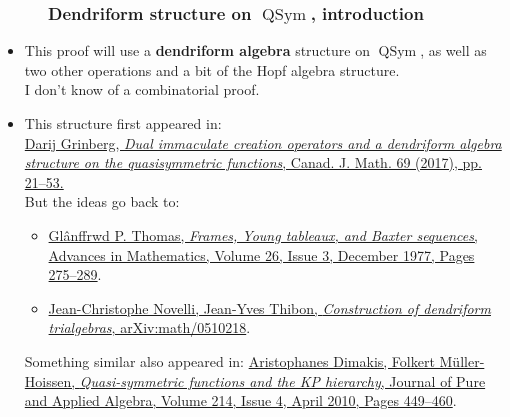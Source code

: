 \documentclass{beamer}
\newcommand{\red}{\color{red}}
\newcommand{\QSym}{\operatorname{QSym}}
\newcommand{\fti}[1]{\frametitle{\ \ \ \ \ #1}}
\theoremstyle{plain}
\begin{document}
\begin{frame}
\fti{Dendriform structure on $\QSym$, introduction}

\begin{itemize}

\item This proof will use a \textbf{dendriform algebra} structure on $\QSym$,
      as well as two other operations and a bit of the Hopf algebra
      structure. \\
      I don't know of a combinatorial proof.

\item This structure first appeared in: \\
      {\red \href{http://www.cip.ifi.lmu.de/~grinberg/algebra/dimcreation.pdf}{\red Darij Grinberg, \textit{Dual immaculate creation operators and a dendriform algebra structure on the quasisymmetric functions}, Canad. J. Math. 69 (2017), pp. 21--53.}}
      \\
      But the ideas go back to:
      \begin{itemize}
      \item
      {\red \href{http://www.sciencedirect.com/science/article/pii/0001870877900421}{Gl\^anffrwd P. Thomas, \textit{Frames, Young tableaux, and Baxter sequences}, Advances in Mathematics, Volume 26, Issue 3, December 1977, Pages 275--289}}.
      \item
      {\red \href{http://arxiv.org/abs/math/0510218}{Jean-Christophe Novelli, Jean-Yves Thibon,
\textit{Construction of dendriform trialgebras}, arXiv:math/0510218}}.
      \end{itemize}
      Something similar also appeared in:
      {\red \href{https://doi.org/10.1016/j.jpaa.2009.06.001}{Aristophanes Dimakis, Folkert M\"uller-Hoissen,
      \textit{Quasi-symmetric functions and the KP hierarchy},
      Journal of Pure and Applied Algebra, Volume 214, Issue 4, April 2010, Pages 449--460}}.

\end{itemize}

\vspace{9cm}

\end{frame}
\end{document}
